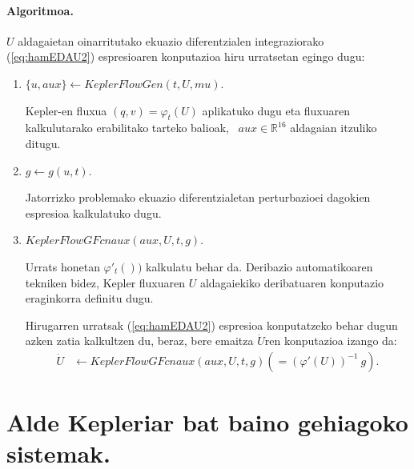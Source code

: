 \paragraph*{Algoritmoa.}
$U$ aldagaietan oinarritutako ekuazio diferentzialen integraziorako (\ref{eq:hamEDAU2}) espresioaren konputazioa hiru urratsetan egingo dugu:
\begin{enumerate}
\item $\{u,aux\} \leftarrow KeplerFlowGen (t,U,mu)$.

Kepler-en fluxua $(q,v)= \varphi_t(U)$ aplikatuko dugu eta fluxuaren kalkulutarako erabilitako tarteko balioak, ~$aux\in \mathbb{R}^{16}$ aldagaian itzuliko ditugu. 

\item $g \leftarrow g(u,t)$.

Jatorrizko problemako ekuazio diferentzialetan perturbazioei dagokien espresioa kalkulatuko dugu.

\item $KeplerFlowGFcnaux(aux,U,t,g)$.

Urrats honetan $\varphi'_t())$ kalkulatu behar da. Deribazio automatikoaren tekniken bidez, Kepler fluxuaren $U$ aldagaiekiko deribatuaren konputazio eraginkorra definitu dugu. 

Hirugarren urratsak (\ref{eq:hamEDAU2}) espresioa konputatzeko behar dugun azken zatia kalkultzen du, beraz, bere emaitza $\dot{U}$ren konputazioa izango da: 
\begin{align*}
\dot{U}&\leftarrow KeplerFlowGFcnaux(aux,U,t,g) \left(= ( \varphi'(U))^{-1} \ g\right).
\end{align*}

\end{enumerate} 



\section{Alde Kepleriar bat baino gehiagoko sistemak.}

